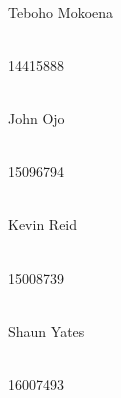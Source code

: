 \documentclass[11pt]{article}
\begin{document}
\begin{titlepage}
\begin{center}
		\begin{minipage}{0.4\textwidth}
			\begin{flushleft} \large
				\emph{} \\
				Teboho {Mokoena}
			\end{flushleft}
		\end{minipage}
		\begin{minipage}{0.4\textwidth}
			\begin{flushright} \large
				\emph{} \\
				14415888
			\end{flushright}
		\end{minipage}

		\begin{minipage}{0.4\textwidth}
			\begin{flushleft} \large
				\emph{} \\
				John {Ojo}
			\end{flushleft}
		\end{minipage}
		\begin{minipage}{0.4\textwidth}
			\begin{flushright} \large
				\emph{} \\
				15096794
			\end{flushright}
		\end{minipage}

        \begin{minipage}{0.4\textwidth}
			\begin{flushleft} \large
				\emph{} \\
				Kevin {Reid}
			\end{flushleft}
		\end{minipage}
		\begin{minipage}{0.4\textwidth}
			\begin{flushright} \large
				\emph{} \\
				15008739
			\end{flushright}
		\end{minipage}

        \begin{minipage}{0.4\textwidth}
			\begin{flushleft} \large
				\emph{} \\
				Shaun {Yates}
			\end{flushleft}
		\end{minipage}
		\begin{minipage}{0.4\textwidth}
			\begin{flushright} \large
				\emph{} \\
				16007493
			\end{flushright}
		\end{minipage}


\end{center}
\end{titlepage}
\end{document}
